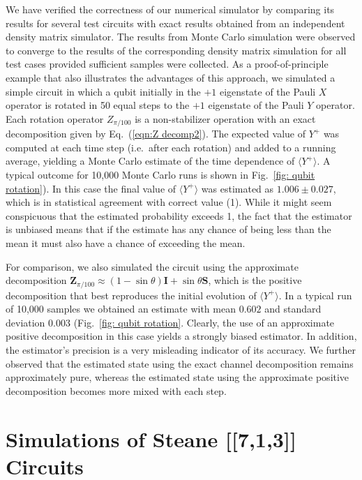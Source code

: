 \documentclass[twocolumn,pra]{revtex4}
\begin{document}
We have verified the correctness of our numerical simulator by comparing its results for several test circuits with exact results obtained from an independent density matrix simulator. The results from Monte Carlo simulation were observed to converge to the results of the corresponding density matrix simulation for all test cases provided sufficient samples were collected. As a proof-of-principle example that also illustrates the advantages of this approach, we simulated a simple circuit in which a qubit initially in the $+1$ eigenstate of the Pauli $X$ operator is rotated in 50 equal steps to the $+1$ eigenstate of the Pauli $Y$ operator. Each rotation operator $Z_{\pi/100}$ is a non-stabilizer operation with an exact decomposition given by Eq.~(\ref{eqn:Z decomp2}). The expected value of $Y^{+}$ was computed at each time step (i.e.~after each rotation) and added to a running average, yielding a Monte Carlo estimate of the time dependence of  $\langle Y^{+}\rangle$. A typical outcome for 10,000 Monte Carlo runs is shown in Fig.~\ref{fig: qubit rotation}). In this case the final value of $\langle Y^{+} \rangle$ was estimated as $1.006\pm0.027$, which is in statistical agreement with correct value (1). While it might seem conspicuous that the estimated probability exceeds 1, the fact that the estimator is unbiased means that if the estimate has any chance of being less than the mean it must also have a chance of exceeding the mean.
\par
For comparison, we also simulated the circuit using the approximate decomposition $\mathbf{Z}_{\pi/100} \approx (1-\sin\theta) \mathbf{I} +\sin\theta \mathbf{S}$, which is the positive decomposition that best reproduces the initial evolution of $\langle Y^{+} \rangle$. In a typical run of 10,000 samples we obtained an estimate with mean $0.602$ and standard deviation $0.003$  (Fig.~\ref{fig: qubit rotation}. Clearly, the use of an approximate positive decomposition in this case yields a strongly biased estimator. In addition, the estimator's precision is a very misleading indicator of its accuracy. We further observed that the estimated state using the exact channel decomposition remains approximately pure, whereas the estimated state using the approximate positive decomposition becomes more mixed with each step.



\section{Simulations of Steane [[7,1,3]] Circuits} 
\label{sec: Steane results}
\end{document}
